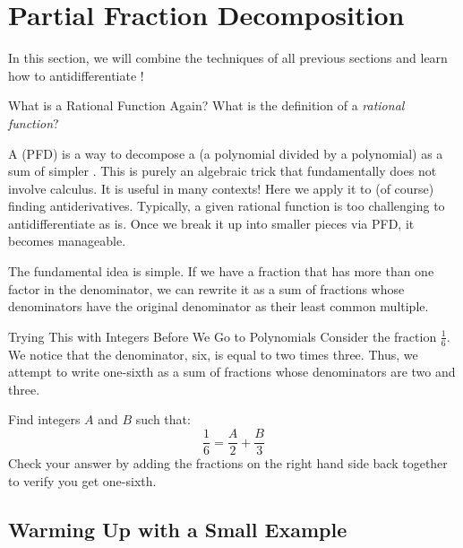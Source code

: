 \section{Partial Fraction Decomposition}

In this section, we will combine the techniques of all previous sections and learn how to antidifferentiate !

\begin{exercise}{What is a Rational Function Again? \Coffeecup}
What is the definition of a \emph{rational function}?
\end{exercise}

A  (PFD) is a way to decompose a  (a polynomial divided by a polynomial) as a sum of simpler .  This is purely an algebraic trick that fundamentally does not involve calculus.  It is useful in many contexts!  Here we apply it to (of course) finding antiderivatives. Typically, a given rational function is too challenging to antidifferentiate as is. Once we break it up into smaller pieces via PFD, it becomes manageable.

The fundamental idea is simple. If we have a fraction that has more than one factor in the denominator, we can rewrite it as a sum of fractions whose denominators have the original denominator as their least common multiple. 
\begin{exercise}{Trying This with Integers Before We Go to Polynomials \Coffeecup}
 Consider the fraction $\frac{1}{6}$.  We notice that the denominator, six, is equal to two times three.  Thus, we attempt to write one-sixth as a sum of fractions whose denominators are two and three.
 
Find integers $A$ and $B$ such that:
$$\frac{1}{6}=\frac{A}{2}+\frac{B}{3} $$
Check your answer by adding the fractions on the right hand side back together to verify you get one-sixth. 
\end{exercise}

\subsection{Warming Up with a Small Example}\label{PotatoFryDip}

